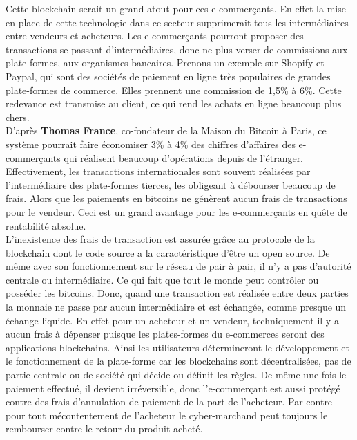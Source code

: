 \documentclass[12pt]{report}
\begin{document}
\begin{enumerate}
\hspace{1cm} Cette blockchain serait un grand atout pour ces e-commerçants. En effet la mise en place de cette technologie dans ce secteur supprimerait tous les intermédiaires entre vendeurs et acheteurs. Les e-commerçants pourront proposer des transactions se passant d'intermédiaires, donc ne plus verser de commissions aux plate-formes, aux organismes bancaires. Prenons un exemple sur Shopify et Paypal, qui sont des sociétés de paiement en ligne très populaires de grandes plate-formes de commerce. Elles prennent une commission de 1,5\% à 6\%. Cette redevance est transmise au client, ce qui rend les achats en ligne beaucoup plus chers.\\

\hspace{1cm} D'après \textbf{Thomas France}, co-fondateur de la Maison du Bitcoin à Paris, ce système pourrait faire économiser 3\% à 4\% des chiffres d'affaires des e-commerçants qui réalisent beaucoup d'opérations depuis de l'étranger. Effectivement, les transactions internationales sont souvent réalisées par l'intermédiaire des plate-formes tierces, les obligeant à débourser beaucoup de frais. Alors que les paiements en bitcoins ne génèrent aucun frais de transactions pour le vendeur. Ceci est un grand avantage pour les e-commerçants en quête de rentabilité absolue.\\

\hspace{1cm} L'inexistence des frais de transaction est assurée grâce au protocole de la blockchain dont le code source a la caractéristique d'être un open source. De même avec son fonctionnement sur le réseau de pair à pair, il n'y a pas d'autorité centrale ou intermédiaire. Ce qui fait que tout le monde peut contrôler ou posséder les bitcoins. Donc, quand une transaction est réalisée entre deux parties la monnaie ne passe par aucun intermédiaire et est échangée, comme presque un échange liquide. En effet pour un acheteur et un vendeur, techniquement il y a aucun frais à dépenser puisque les plates-formes du e-commerces seront des applications blockchains. Ainsi les utilisateurs détermineront le développement et le fonctionnement de la plate-forme car les blockchains sont décentralisées, pas de partie centrale ou de société qui décide ou définit les règles. De même une fois le paiement effectué, il devient irréversible, donc l'e-commerçant est aussi protégé contre des frais d'annulation de paiement de la part de l'acheteur. Par contre pour tout mécontentement de l'acheteur le cyber-marchand  peut toujours le rembourser contre le retour du produit acheté.\\


\end{enumerate}
\end{document}
